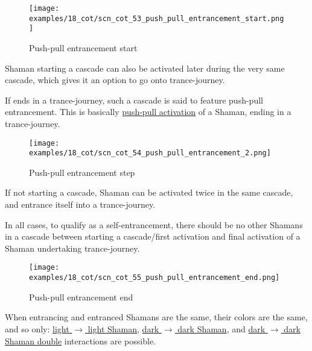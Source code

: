 \noindent
\begin{wrapfigure}[9]{l}{0.4\textwidth}
\centering
\texttt{[image: examples/18\_cot/scn\_cot\_53\_push\_pull\_entrancement\_start.png]}
\caption{Push-pull entrancement start}
\label{fig:star/scn_cot_53_push_pull_entrancement_start}
\end{wrapfigure}
Shaman starting a cascade can also be activated later during the very same cascade,
which gives it an option to go onto trance-journey.

If ends in a trance-journey, such a cascade is said to feature push-pull entrancement.
This is basically
\hyperref[sec:Terms/Push-pull activation]{push-pull activation} of a Shaman, ending
in a trance-journey.

\vspace*{0.05\textheight}
\noindent
\begin{wrapfigure}[11]{l}{0.4\textwidth}
\centering
\texttt{[image: examples/18\_cot/scn\_cot\_54\_push\_pull\_entrancement\_2.png]}
\caption{Push-pull entrancement step}
\label{fig:star/scn_cot_54_push_pull_entrancement_2}
\end{wrapfigure}
If not starting a cascade, Shaman can be activated twice in the same cascade, and
entrance itself into a trance-journey.

In all cases, to qualify as a self-entrancement, there should be no other Shamans
in a cascade between starting a cascade/first activation and final activation of
a Shaman undertaking trance-journey.

\clearpage %

\noindent
\begin{figure}[!h]
\texttt{[image: examples/18\_cot/scn\_cot\_55\_push\_pull\_entrancement\_end.png]}
\caption{Push-pull entrancement end}
\label{fig:scn_cot_55_push_pull_entrancement_end}
\end{figure}

When entrancing and entranced Shamans are the same, their colors are the same, and so only: \newline
\hyperref[fig:scn_cot_38_light_light_shaman_interaction_start]{light $\rightarrow$ light Shaman}, \newline
\hyperref[fig:scn_cot_42_dark_dark_shaman_interaction_start]{dark $\rightarrow$ dark Shaman}, and \newline
\hyperref[fig:scn_cot_44_dark_dark_shaman_double_interaction_start]{dark $\rightarrow$ dark Shaman double}
interactions are possible.

